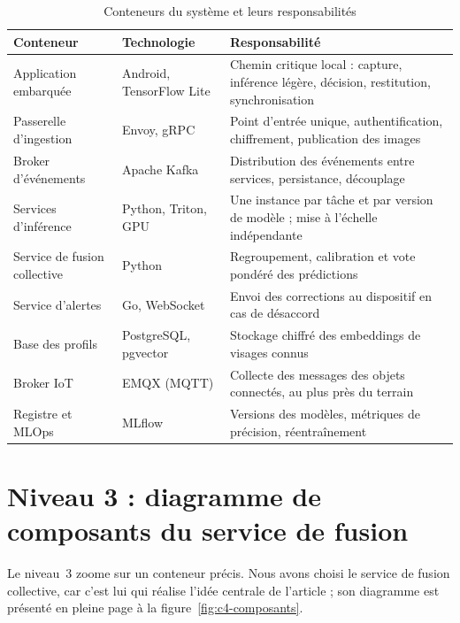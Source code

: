 \documentclass[11pt,a4paper]{report}
\begin{document}
\begin{table}[H]
\centering
\caption{Conteneurs du système et leurs responsabilités}
\label{tab:conteneurs}
\begin{tabularx}{\textwidth}{>{\raggedright\arraybackslash}p{3.6cm} >{\raggedright\arraybackslash}p{3.6cm} L}
\toprule
{}\textbf{Conteneur} & \textbf{Technologie} & \textbf{Responsabilité}\\
\midrule
Application embarquée & Android, TensorFlow Lite & Chemin critique local : capture, inférence légère, décision, restitution, synchronisation\\
Passerelle d'ingestion & Envoy, gRPC & Point d'entrée unique, authentification, chiffrement, publication des images\\
Broker d'événements & Apache Kafka & Distribution des événements entre services, persistance, découplage\\
Services d'inférence & Python, Triton, GPU & Une instance par tâche et par version de modèle ; mise à l'échelle indépendante\\
Service de fusion collective & Python & Regroupement, calibration et vote pondéré des prédictions\\
Service d'alertes & Go, WebSocket & Envoi des corrections au dispositif en cas de désaccord\\
Base des profils & PostgreSQL, pgvector & Stockage chiffré des embeddings de visages connus\\
Broker IoT & EMQX (MQTT) & Collecte des messages des objets connectés, au plus près du terrain\\
Registre et MLOps & MLflow & Versions des modèles, métriques de précision, réentraînement\\
\bottomrule
\end{tabularx}
\end{table}

\section{Niveau 3 : diagramme de composants du service de fusion}

Le niveau~3 zoome sur un conteneur précis. Nous avons choisi le service de fusion collective, car c'est lui qui réalise l'idée centrale de l'article ; son diagramme est présenté en pleine page à la figure~\ref{fig:c4-composants}.
\end{document}
